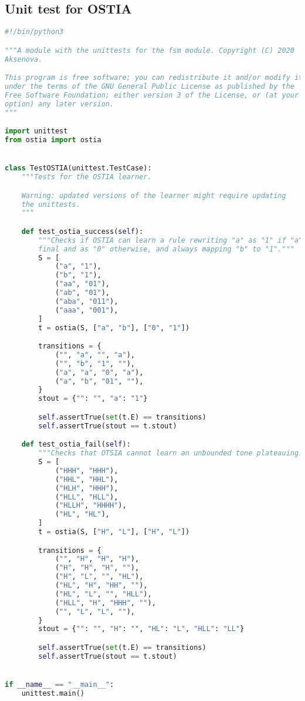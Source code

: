 \subsection*{Unit test for OSTIA}

\begin{lstlisting}[language=Python]
#!/bin/python3

"""A module with the unittests for the fsm module. Copyright (C) 2020  Alena
Aksenova.

This program is free software; you can redistribute it and/or modify it
under the terms of the GNU General Public License as published by the
Free Software Foundation; either version 3 of the License, or (at your
option) any later version.
"""

import unittest
from ostia import ostia


class TestOSTIA(unittest.TestCase):
    """Tests for the OSTIA learner.

    Warning: updated versions of the learner might require updating
    the unittests.
    """

    def test_ostia_success(self):
        """Checks if OSTIA can learn a rule rewriting "a" as "1" if "a" is
        final and as "0" otherwise, and always mapping "b" to "1"."""
        S = [
            ("a", "1"),
            ("b", "1"),
            ("aa", "01"),
            ("ab", "01"),
            ("aba", "011"),
            ("aaa", "001"),
        ]
        t = ostia(S, ["a", "b"], ["0", "1"])

        transitions = {
            ("", "a", "", "a"),
            ("", "b", "1", ""),
            ("a", "a", "0", "a"),
            ("a", "b", "01", ""),
        }
        stout = {"": "", "a": "1"}

        self.assertTrue(set(t.E) == transitions)
        self.assertTrue(stout == t.stout)

    def test_ostia_fail(self):
        """Checks that OTSIA cannot learn an unbounded tone plateauing."""
        S = [
            ("HHH", "HHH"),
            ("HHL", "HHL"),
            ("HLH", "HHH"),
            ("HLL", "HLL"),
            ("HLLH", "HHHH"),
            ("HL", "HL"),
        ]
        t = ostia(S, ["H", "L"], ["H", "L"])

        transitions = {
            ("", "H", "H", "H"),
            ("H", "H", "H", ""),
            ("H", "L", "", "HL"),
            ("HL", "H", "HH", ""),
            ("HL", "L", "", "HLL"),
            ("HLL", "H", "HHH", ""),
            ("", "L", "L", ""),
        }
        stout = {"": "", "H": "", "HL": "L", "HLL": "LL"}

        self.assertTrue(set(t.E) == transitions)
        self.assertTrue(stout == t.stout)


if __name__ == "__main__":
    unittest.main()

\end{lstlisting}